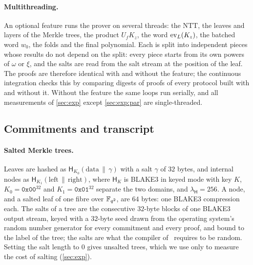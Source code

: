 \paragraph{Multithreading.}
An optional feature runs the prover on several threads: the NTT, the leaves and layers of the Merkle trees, the product $U_f K_z$, the word $\mathrm{ev}_L(K_z)$, the batched word $w_0$, the folds and the final polynomial.
Each is split into independent pieces whose results do not depend on the split: every piece starts from its own powers of $\omega$ or $\xi$, and the salts are read from the salt stream at the position of the leaf.
The proofs are therefore identical with and without the feature; the continuous integration checks this by comparing digests of proofs of every protocol built with and without it.
Without the feature the same loops run serially, and all measurements of \cref{sec:exp} except \cref{sec:exp:par} are single-threaded.

\subsection{Commitments and transcript}\label{sec:impl:merkle}

\paragraph{Salted Merkle trees.}
Leaves are hashed as $\mathsf{H}_{K_0}(\text{data} \,\|\, \gamma)$ with a salt $\gamma$ of $32$ bytes, and internal nodes as $\mathsf{H}_{K_1}(\text{left} \,\|\, \text{right})$, where $\mathsf{H}_K$ is BLAKE3 in keyed mode with key $K$, $K_0 = \mathtt{0x00}^{32}$ and $K_1 = \mathtt{0x01}^{32}$ separate the two domains, and $\lambda_{\mathsf{H}} = 256$. A node, and a salted leaf of one fibre over $\mathbb{F}_{q^2}$, are $64$ bytes: one BLAKE3 compression each.
The salts of a tree are the consecutive $32$-byte blocks of one BLAKE3 output stream, keyed with a $32$-byte seed drawn from the operating system's random number generator for every commitment and every proof, and bound to the label of the tree; the salts are what the compiler of~\cite{CDHZ25} requires to be random.
Setting the salt length to $0$ gives unsalted trees, which we use only to measure the cost of salting (\cref{sec:exp}).

